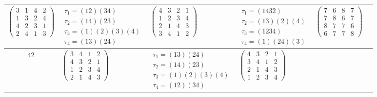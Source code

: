 \begin{longtable}{|c|p{2.7cm}|p{2.7cm}|p{2.7cm}|p{2.7cm}|p{2.7cm}|}
    $\begin{pmatrix} 3 & 1 & 4 & 2 \\ 1 & 3 & 2 & 4 \\ 4 & 2 & 3 & 1 \\ 2 & 4 & 1 & 3 \end{pmatrix}$               &
    $\begin{array}{l}\tau_{1}=(12)(34)\\ \tau_{2}=(14)(23)\\ \tau_{3}=(1)(2)(3)(4)\\ \tau_{4}=(13)(24)\end{array}$ &
    $\begin{pmatrix} 4 & 3 & 2 & 1 \\ 1 & 2 & 3 & 4 \\ 2 & 1 & 4 & 3 \\ 3 & 4 & 1 & 2 \end{pmatrix}$               &
    $\begin{array}{l}\tau_{1}=(1432)\\ \tau_{2}=(13)(2)(4)\\ \tau_{3}=(1234)\\ \tau_{4}=(1)(24)(3)\end{array}$     &
    $\begin{pmatrix} 7 & 6 & 8 & 7 \\ 7 & 8 & 6 & 7 \\ 8 & 7 & 7 & 6 \\ 6 & 7 & 7 & 8 \end{pmatrix}$                                                                                           \\
    \hline
    42                                                                                                             &
    $\begin{pmatrix} 3 & 4 & 1 & 2 \\ 4 & 3 & 2 & 1 \\ 1 & 2 & 3 & 4 \\ 2 & 1 & 4 & 3 \end{pmatrix}$               &
    $\begin{array}{l}\tau_{1}=(13)(24)\\ \tau_{2}=(14)(23)\\ \tau_{3}=(1)(2)(3)(4)\\ \tau_{4}=(12)(34)\end{array}$ &
    $\begin{pmatrix} 4 & 3 & 2 & 1 \\ 3 & 4 & 1 & 2 \\ 2 & 1 & 4 & 3 \\ 1 & 2 & 3 & 4 \end{pmatrix}$               &

\end{longtable}
